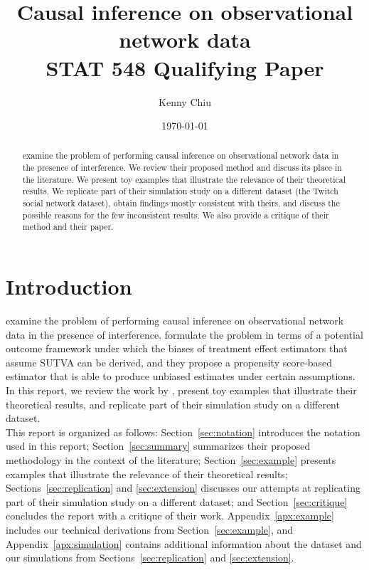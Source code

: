 \documentclass[10pt]{article}
\title{Causal inference on observational network data\\\vspace{0.5em}\large{STAT 548 Qualifying Paper}}
\author{Kenny Chiu}
\date{\today}
\begin{document}
\maketitle

\vspace{2em}

\begin{abstract}
\textcite{Forastiere:2021} examine the problem of performing causal inference on observational network data in the presence of interference. We review their proposed method and discuss its place in the literature. We present toy examples that illustrate the relevance of their theoretical results. We replicate part of their simulation study on a different dataset (the Twitch social network dataset), obtain findings mostly consistent with theirs, and discuss the possible reasons for the few inconsistent results. We also provide a critique of their method and their paper.
\end{abstract}

\vspace{2em}


\section{Introduction}

\textcite{Forastiere:2021} examine the problem of performing causal inference on observational network data in the presence of interference. \citeauthor{Forastiere:2021} formulate the problem in terms of a potential outcome framework under which the biases of treatment effect estimators that assume SUTVA can be derived, and they propose a propensity score-based estimator that is able to produce unbiased estimates under certain assumptions. In this report, we review the work by \textcite{Forastiere:2021}, present toy examples that illustrate their theoretical results, and replicate part of their simulation study on a different dataset.
\\

This report is organized as follows: Section~\ref{sec:notation} introduces the notation used in this report; Section~\ref{sec:summary} summarizes their proposed methodology in the context of the literature; Section~\ref{sec:example} presents examples that illustrate the relevance of their theoretical results; Sections~\ref{sec:replication} and \ref{sec:extension} discusses our attempts at replicating part of their simulation study on a different dataset; and Section~\ref{sec:critique} concludes the report with a critique of their work. Appendix~\ref{apx:example} includes our technical derivations from Section~\ref{sec:example}, and Appendix~\ref{apx:simulation} contains additional information about the dataset and our simulations from Sections~\ref{sec:replication} and \ref{sec:extension}.
\end{document}
